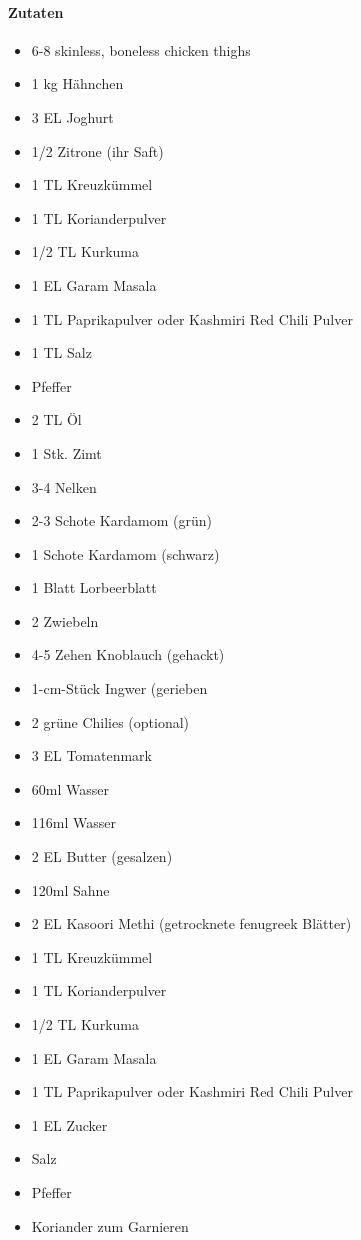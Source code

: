 \newpage
{}

\paragraph{Zutaten}
\begin{itemize}[noitemsep]
	\item 6-8 skinless, boneless chicken thighs
	\item 1 kg Hähnchen
	\item 3 EL Joghurt
	\item 1/2 Zitrone (ihr Saft)
	\item 1 TL Kreuzkümmel
	\item 1 TL Korianderpulver
	\item 1/2 TL Kurkuma
	\item 1 EL Garam Masala
	\item 1 TL Paprikapulver oder Kashmiri Red Chili Pulver
	\item 1 TL Salz
	\item Pfeffer
	\vspace{0.5cm}
	\item 2 TL Öl
	\item 1 Stk. Zimt
	\item 3-4 Nelken
	\item 2-3 Schote Kardamom (grün)
	\item 1 Schote Kardamom (schwarz)
	\item 1 Blatt Lorbeerblatt	
	\item 2 Zwiebeln
	\item 4-5 Zehen Knoblauch (gehackt)
	\item 1-cm-Stück Ingwer (gerieben
	\item 2 grüne Chilies (optional)
	\item 3 EL Tomatenmark
	\item 60ml Wasser 
	\vspace{0.5cm}
	\item 116ml Wasser
	\item 2 EL Butter (gesalzen)
	\item 120ml Sahne
	\item 2 EL Kasoori Methi (getrocknete fenugreek Blätter)
	\item 1 TL Kreuzkümmel
	\item 1 TL Korianderpulver
	\item 1/2 TL Kurkuma
	\item 1 EL Garam Masala
	\item 1 TL Paprikapulver oder Kashmiri Red Chili Pulver
	\item 1 EL Zucker
	\item Salz
	\item Pfeffer
	\item Koriander zum Garnieren
\end{itemize}

